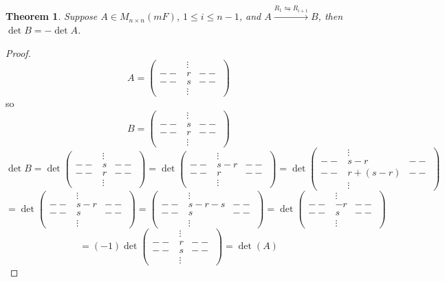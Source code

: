 \documentclass[12pt]{article}
\theoremstyle{plain}
\newtheorem{theorem}{Theorem}[subsection]
\begin{document}
\begin{theorem}
	Suppose $A \in M_{n\times n} (mF)$,  $1 \leq i\leq n-1$, and 
	$A \overset{R_1 \leftrightharpoons R_{i+1}}{\longrightarrow} B$, then
	$\det B = - \det A$. 
\end{theorem}
\begin{proof}
	\[
		A = 
		\begin{pmatrix}
				& \vdots&	\\
			-- & r		&--\\
			-- & s		&--\\
				& \vdots&
		\end{pmatrix}
	\]
	so 
	\[
		B = 
		\begin{pmatrix}
				& \vdots&	\\
			-- & s		&--\\
			-- & r		&--\\
				& \vdots&
		\end{pmatrix}
	\]
	\[
		\det B = \det \begin{pmatrix}
				& \vdots&	\\
			-- & s		&--\\
			-- & r		&--\\
				& \vdots&
		\end{pmatrix}
		= \det \begin{pmatrix}
				& \vdots&	\\
			-- & s - r		&--\\
			-- & r		&--\\
				& \vdots&
		\end{pmatrix}
		= \det \begin{pmatrix}
				& \vdots&	\\
			-- & s-r		&--\\
			-- & r+(s-r)	&--\\
				& \vdots&
		\end{pmatrix}
		\]\[
		= \det \begin{pmatrix}
				& \vdots&	\\
			-- & s-r		&--\\
			-- & s		&--\\
				& \vdots&
		\end{pmatrix}
		= \begin{pmatrix}
				& \vdots&	\\
			-- & s-r-s		&--\\
			-- & s		&--\\
				& \vdots&
		\end{pmatrix}
		= \det\begin{pmatrix}
				& \vdots&	\\
			-- & -r		&--\\
			-- & s		&--\\
				& \vdots&
		\end{pmatrix}\]\[
		= (-1) \det\begin{pmatrix}
				& \vdots&	\\
			-- & r		&--\\
			-- & s		&--\\
				& \vdots&
		\end{pmatrix}
		= \det (A)
	\]
\end{proof}
\end{document}
